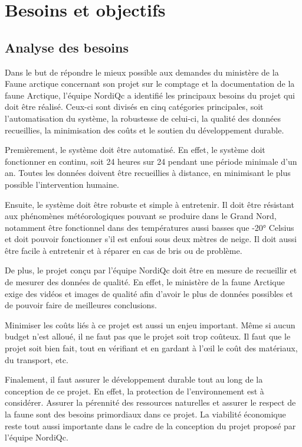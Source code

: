 \chapter{Besoins et objectifs}

\section{Analyse des besoins}

Dans le but de répondre le mieux possible aux demandes du ministère de la Faune
arctique concernant son projet sur le comptage et la documentation de la faune
Arctique, l’équipe NordiQc a identifié les principaux besoins du projet qui
doit être réalisé. Ceux-ci sont divisés en cinq catégories principales, soit
l’automatisation du système, la robustesse de celui-ci, la qualité des données
recueillies, la minimisation des coûts et le soutien du développement durable.

Premièrement, le système doit être automatisé. En effet, le système doit
fonctionner en continu, soit 24 heures sur 24 pendant une période minimale d’un
an. Toutes les données doivent être recueillies à distance, en minimisant le
plus possible l’intervention humaine.

Ensuite, le système doit être robuste et simple à entretenir. Il doit être
résistant aux phénomènes météorologiques pouvant se produire dans le Grand
Nord, notamment être fonctionnel dans des températures aussi basses que -20°
Celsius et doit pouvoir fonctionner s’il est enfoui sous deux mètres de neige.
Il doit aussi être facile à entretenir et à réparer en cas de bris ou de
problème.

De plus, le projet conçu par l’équipe NordiQc doit être en mesure de recueillir
et de mesurer des données de qualité. En effet, le ministère de la faune
Arctique exige des vidéos et images de qualité afin d’avoir le plus de données
possibles et de pouvoir faire de meilleures conclusions.

Minimiser les coûts liés à ce projet est aussi un enjeu important. Même si
aucun budget n’est alloué, il ne faut pas que le projet soit trop coûteux. Il
faut que le projet soit bien fait, tout en vérifiant et en gardant à l’œil le
coût des matériaux, du transport, etc.

Finalement, il faut assurer le développement durable tout au long de la
conception de ce projet. En effet, la protection de l’environnement est à
considérer. Assurer la pérennité des ressources naturelles et assurer le
respect de la faune sont des besoins primordiaux dans ce projet. La viabilité
économique reste tout aussi importante dans le cadre de la conception du projet
proposé par l’équipe NordiQc.


